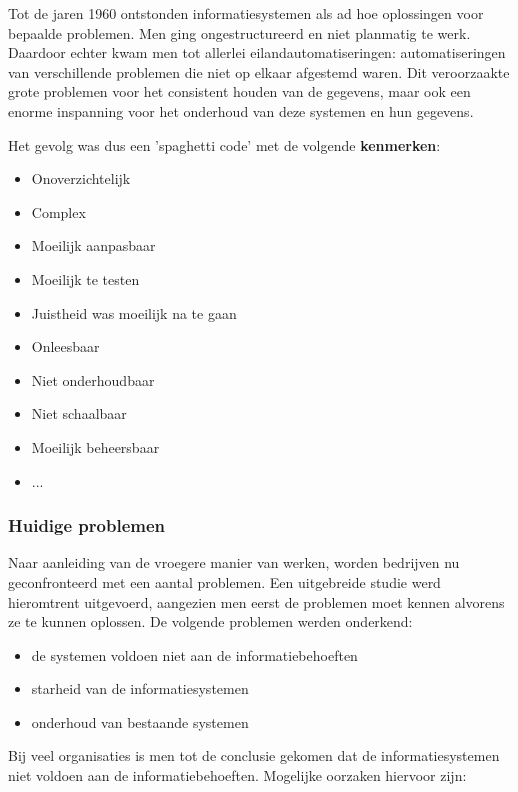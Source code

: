 Tot de jaren 1960 ontstonden informatiesystemen als ad hoe oplossingen voor bepaalde problemen. Men ging ongestructureerd en niet planmatig te werk. Daardoor echter kwam men tot allerlei eilandautomatiseringen: automatiseringen van verschillende problemen die niet op elkaar afgestemd waren. Dit veroorzaakte grote problemen voor het consistent houden van de gegevens, maar ook een enorme inspanning voor het onderhoud van deze systemen en hun gegevens.

Het gevolg was dus een 'spaghetti code’ met de volgende \textbf{kenmerken}:
\begin{multicols}{2}
\begin{itemize}
\item Onoverzichtelijk
\item Complex
\item Moeilijk aanpasbaar
\item Moeilijk te testen
\item Juistheid was moeilijk na te gaan
\item Onleesbaar
\item Niet onderhoudbaar
\item Niet schaalbaar
\item Moeilijk beheersbaar
\item ...
\end{itemize}
\end{multicols}

\subsubsection{Huidige problemen}

Naar aanleiding van de vroegere manier van werken, worden bedrijven nu geconfronteerd met een aantal problemen. Een uitgebreide studie werd hieromtrent uitgevoerd, aangezien men eerst de problemen moet kennen alvorens ze te kunnen oplossen. De volgende problemen werden onderkend:

\begin{itemize}
    \item de systemen voldoen niet aan de informatiebehoeften
    \item starheid van de informatiesystemen
    \item onderhoud van bestaande systemen
\end{itemize}


Bij veel organisaties is men tot de conclusie gekomen dat de informatiesystemen niet voldoen aan de informatiebehoeften. Mogelijke oorzaken hiervoor zijn:

